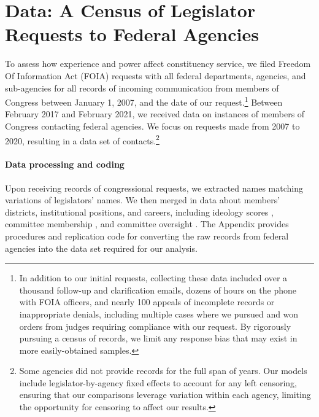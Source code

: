 \documentclass[12pt]{article}
\begin{document}

\section{Data: A Census of Legislator Requests to Federal Agencies} \label{s:data}
To assess how experience and power affect constituency service, we filed  Freedom Of Information Act (FOIA) requests with all federal departments, agencies, and sub-agencies for all records of incoming communication from members of Congress between January 1, 2007, and the date of our request.\footnote{In addition to our initial requests, collecting these data included over a thousand follow-up and clarification emails, dozens of hours on the phone with FOIA officers, and nearly 100 appeals of incomplete records or inappropriate denials, including multiple cases where we pursued and won orders from judges requiring compliance with our request. By rigorously pursuing a census of records, we limit any response bias that may exist in more easily-obtained samples.} 
Between February 2017 and February 2021, we received data on  instances of members of Congress contacting federal agencies. We focus on requests made from 2007 to 2020, resulting in a data set of   contacts.\footnote{Some agencies did not provide records for the full span of years. Our models include legislator-by-agency fixed effects to account for any left censoring, ensuring that our comparisons leverage variation within each agency, limiting the opportunity for censoring to affect our results.} 



\paragraph{Data processing and coding} Upon receiving records of congressional requests, we extracted names matching variations of legislators' names. %
We then merged in data about members' districts, institutional positions, and careers, including ideology scores \citep{dwnominate2018}, committee membership \citep{StewartWoon2017}, and committee oversight \citep{LewisSelin2012}. %
The Appendix provides procedures and replication code for converting the raw records from federal agencies into the data set required for our analysis. 
\end{document}
